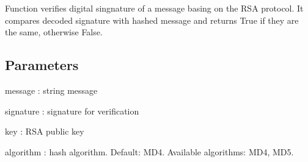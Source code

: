 \documentclass[letterpaper,10pt,english]{sphinxmanual}
\begin{document}
\begin{fulllineitems}
\label{\detokenize{todo_project_name:todo_project_name.rsa.rsa_verify}}
\pysigstartsignatures
{}
\pysigstopsignatures
\sphinxAtStartPar
Function verifies digital singnature of a message basing on the RSA protocol.
It compares decoded signature with hashed message
and returns True if they are the same, otherwise False.


\subsection{Parameters}
\label{\detokenize{todo_project_name:id9}}
\sphinxAtStartPar
message
: string message

\sphinxAtStartPar
signature
: signature for verification

\sphinxAtStartPar
key
: RSA public key

\sphinxAtStartPar
algorithm
: hash algorithm. Default: MD4.
Available algorithms: MD4, MD5.

\end{fulllineitems}

\end{document}
